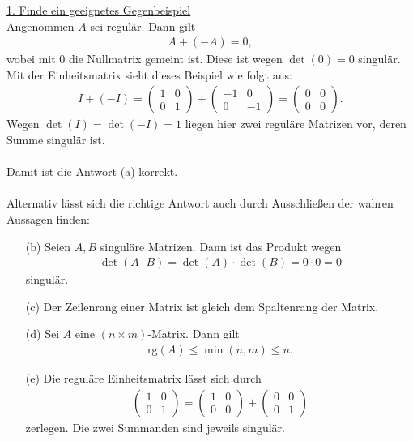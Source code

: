 \underline{1. Finde ein geeignetes Gegenbeispiel}\\
Angenommen $ A $ sei regulär. Dann gilt 
\begin{align*}
	A + (-A) = 0,
\end{align*}
wobei mit $ 0 $ die Nullmatrix gemeint ist. Diese ist wegen $ \det(0) = 0 $ singulär. Mit der Einheitsmatrix sieht dieses Beispiel wie folgt aus:
\begin{align*}
	I + (-I)
	=
	\begin{pmatrix}
		1 & 0 \\
		0 & 1
	\end{pmatrix}
	+
	\begin{pmatrix}
	 -1 & 0 \\
	 0 & -1
	\end{pmatrix}
	=
	\begin{pmatrix}
		0 & 0 \\
		0 & 0
	\end{pmatrix}.
\end{align*} 
Wegen $ \det(I) = \det(-I) = 1 $ liegen hier zwei reguläre Matrizen vor, deren Summe singulär ist.\\
\\
Damit ist die Antwort (a) korrekt.\\
\\
Alternativ lässt sich die richtige Antwort auch durch Ausschließen der wahren Aussagen finden:
\begin{enumerate}
	\item[(b)]
	Seien $ A, B $ singuläre Matrizen. Dann ist das Produkt wegen 
	\begin{align*}
		\det(A \cdot B) = \det(A) \cdot \det(B) = 0 \cdot 0 = 0
	\end{align*}
	singulär.
	\item[(c)] Der Zeilenrang einer Matrix ist gleich dem Spaltenrang der Matrix.
	\item[(d)] 
	Sei $ A $ eine $ (n\times m) $-Matrix. Dann gilt
	\begin{align*}
		\mathrm{rg}(A) \leq \min(n,m) \leq n.
	\end{align*}
	\item[(e)]
	Die reguläre Einheitsmatrix lässt sich durch
	\begin{align*}
		\begin{pmatrix}
			1 & 0\\
			0 & 1
		\end{pmatrix}
		= 
		\begin{pmatrix}
			1 & 0 \\
			0 & 0
		\end{pmatrix}
		+
		\begin{pmatrix}
			0 & 0 \\
			0 & 1
		\end{pmatrix}
	\end{align*}
	zerlegen. Die zwei Summanden sind jeweils singulär.
\end{enumerate}
